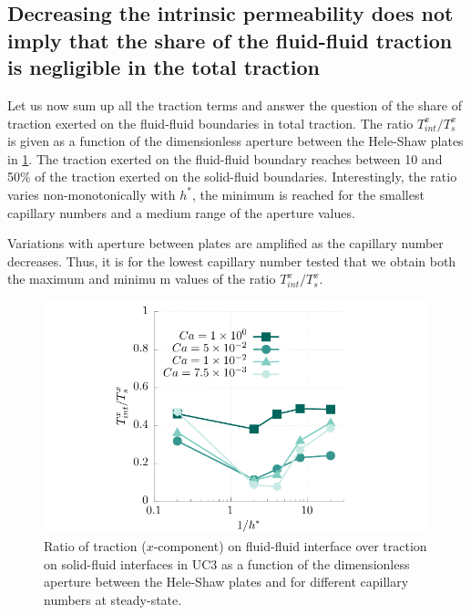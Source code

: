 \documentclass[]{article}
\begin{document}
\hypertarget{decreasing-the-intrinsic-permeability-does-not-imply-that-the-share-of-the-fluid-fluid-traction-is-negligible-in-the-total-traction}{%
\subsection{Decreasing the intrinsic permeability does not imply that
the share of the fluid-fluid traction is negligible in the total
traction}\label{decreasing-the-intrinsic-permeability-does-not-imply-that-the-share-of-the-fluid-fluid-traction-is-negligible-in-the-total-traction}}

Let us now sum up all the traction terms and answer the question of the
share of traction exerted on the fluid-fluid boundaries in total
traction. The ratio \(T_{int}^x/T_{s}^x\) is given as a function of the
dimensionless aperture between the Hele-Shaw plates in
\cref{fig:ratioDrag}. The traction exerted on the fluid-fluid boundary
reaches between 10 and 50\% of the traction exerted on the solid-fluid
boundaries. Interestingly, the ratio varies non-monotonically with
\(h^*\), the minimum is reached for the smallest capillary numbers and a
medium range of the aperture values.

Variations with aperture between plates are amplified as the capillary
number decreases. Thus, it is for the lowest capillary number tested
that we obtain both the maximum and minimu m values of the ratio
\(T_{int}^x/T_{s}^x\).

\begin{figure}
\hypertarget{fig:ratioDrag}{%
\centering
\includegraphics{figures/pdf/ratioDrag.pdf}
\caption{Ratio of traction (\(x\)-component) on fluid-fluid interface
over traction on solid-fluid interfaces in UC3 as a function of the
dimensionless aperture between the Hele-Shaw plates and for different
capillary numbers at steady-state.}\label{fig:ratioDrag}
}
\end{figure}
\end{document}
